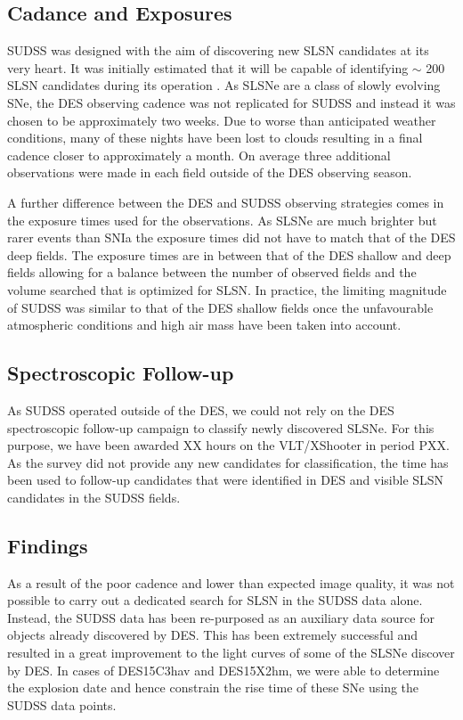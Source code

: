 \subsection{Cadance and Exposures}
\label{sec:SUDSSCadance}
SUDSS was designed with the aim of discovering new SLSN candidates at its very heart. It was initially estimated that it will be capable of identifying $\sim$ 200 SLSN candidates during its operation \citep{Papadopoulos2015}. As SLSNe are a class of slowly evolving SNe, the DES observing cadence was not replicated for SUDSS and instead it was chosen to be approximately two weeks. Due to worse than anticipated weather conditions, many of these nights have been lost to clouds resulting in a final cadence closer to approximately a month. On average three additional observations were made in each field outside of the DES observing season.

A further difference between the DES and SUDSS observing strategies comes in the exposure times used for the observations. As SLSNe are much brighter but rarer events than SNIa the exposure times did not have to match that of the DES deep fields. The exposure times are in between that of the DES shallow and deep fields allowing for a balance between the number of observed fields and the volume searched that is optimized for SLSN. In practice, the limiting magnitude of SUDSS was similar to that of the DES shallow fields once the unfavourable atmospheric conditions and high air mass have been taken into account.

\subsection{Spectroscopic Follow-up}
As SUDSS operated outside of the DES, we could not rely on the DES spectroscopic follow-up campaign to classify newly discovered SLSNe. For this purpose, we have been awarded XX hours on the VLT/XShooter in period PXX. As the survey did not provide any new candidates for classification, the time has been used to follow-up candidates that were identified in DES and visible SLSN candidates in the SUDSS fields.

\subsection{Findings}
As a result of the poor cadence and lower than expected image quality, it was not possible to carry out a dedicated search for SLSN in the SUDSS data alone. Instead, the SUDSS data has been re-purposed as an auxiliary data source for objects already discovered by DES. This has been extremely successful and resulted in a great improvement to the light curves of some of the SLSNe discover by DES. In cases of DES15C3hav and DES15X2hm, we were able to determine the explosion date and hence constrain the rise time of these SNe using the SUDSS data points.

